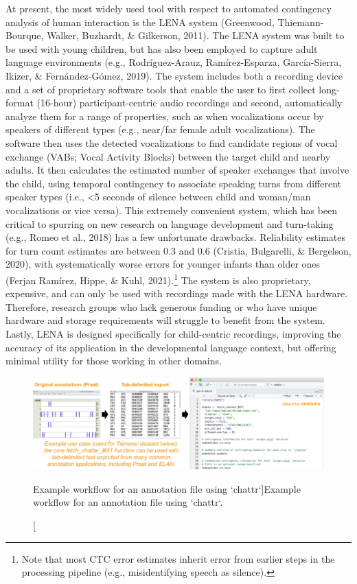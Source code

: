 \documentclass[10pt, letterpaper]{article}
\newenvironment{CodeChunk}{}{}
\begin{document}
At present, the most widely used tool with respect to automated
contingency analysis of human interaction is the LENA system (Greenwood,
Thiemann-Bourque, Walker, Buzhardt, \& Gilkerson, 2011). The LENA system
was built to be used with young children, but has also been employed to
capture adult language environments (e.g., Rodríguez-Arauz,
Ramírez-Esparza, García-Sierra, Ikizer, \& Fernández-Gómez, 2019). The
system includes both a recording device and a set of proprietary
software tools that enable the user to first collect long-format
(16-hour) participant-centric audio recordings and second, automatically
analyze them for a range of properties, such as when vocalizations occur
by speakers of different types (e.g., near/far female adult
vocalizations). The software then uses the detected vocalizations to
find candidate regions of vocal exchange (VABs; Vocal Activity Blocks)
between the target child and nearby adults. It then calculates the
estimated number of speaker exchanges that involve the child, using
temporal contingency to associate speaking turns from different speaker
types (i.e., \textless5 seconds of silence between child and woman/man
vocalizations or vice versa). This extremely convenient system, which
has been critical to spurring on new research on language development
and turn-taking (e.g., Romeo et al., 2018) has a few unfortunate
drawbacks. Reliability estimates for turn count estimates are between
0.3 and 0.6 (Cristia, Bulgarelli, \& Bergelson, 2020), with
systematically worse errors for younger infants than older ones (Ferjan
Ramírez, Hippe, \& Kuhl, 2021).\footnote{Note that most CTC error
  estimates inherit error from earlier steps in the processing pipeline
  (e.g., misidentifying speech as silence).} The system is also
proprietary, expensive, and can only be used with recordings made with
the LENA hardware. Therefore, research groups who lack generous funding
or who have unique hardware and storage requirements will struggle to
benefit from the system. Lastly, LENA is designed specifically for
child-centric recordings, improving the accuracy of its application in
the developmental language context, but offering minimal utility for
those working in other domains.

\begin{CodeChunk}
\begin{figure}[h]

{\centering \includegraphics{figs/workflow-1} 

}

\caption[Example workflow for an annotation file using `chattr`]{Example workflow for an annotation file using `chattr`.}\label{fig:workflow}
\end{figure}
\end{CodeChunk}
\end{document}
